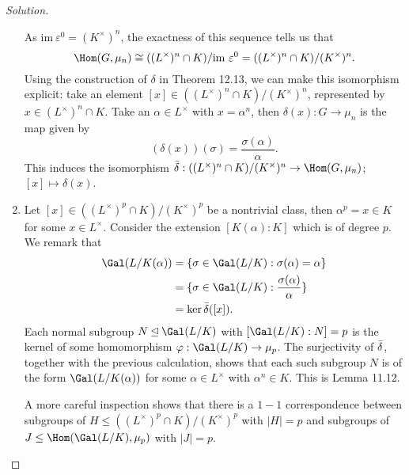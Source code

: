 \documentclass[a4paper,10pt,reqno]{amsart}
\newenvironment{sol}
  {\renewcommand\qedsymbol{$\blacksquare$}\begin{proof}[Solution]}
  {\end{proof}}
\begin{document}
\begin{sol}
\begin{enumerate}[label=(\roman*)]
    As $\mathrm{im}\ \varepsilon^0 = (K^{\times})^n$, the exactness of this sequence tells us that
    \[
    \Hom(G,\mu_n) \cong ((L^{\times})^n \cap K) / \mathrm{im}\ \varepsilon^0 = ((L^{\times})^n \cap K) / (K^{\times})^n.
    \]
    Using the construction of $\delta$ in Theorem 12.13, we can make this isomorphism explicit: take an element $[x] \in ((L^{\times})^n \cap K) / (K^{\times})^n$, represented by $x \in (L^{\times})^n \cap K$. Take an $\alpha \in L^{\times}$ with $x = \alpha^n$, then $\delta(x): G \to \mu_n$ is the map given by
    \[
    (\delta(x))(\sigma) = \frac{\sigma(\alpha)}{\alpha}.
    \]
    This induces the isomorphism $\Bar{\delta}: ((L^{\times})^n \cap K) / (K^{\times})^n \to \Hom(G,\mu_n)$; $[x] \mapsto \delta(x)$.

    \item Let $[x] \in ((L^{\times})^p \cap K) / (K^{\times})^p $ be a nontrivial class, then $\alpha^p = x \in K$ for some $x \in L^{\times}$. Consider the extension $[K(\alpha):K]$ which is of degree $p$. We remark that
    \begin{align*}
    \Gal(L/K(\alpha)) & = \{ \sigma \in \Gal(L/K): \sigma(\alpha) = \alpha \} \\
    & = \{ \sigma \in \Gal(L/K): \frac{\sigma(\alpha)}{\alpha} \} \\
    & = \ker \Bar{\delta}([x]).
    \end{align*}
    Each normal subgroup $N \unlhd \Gal(L/K)$ with $[\Gal(L/K):N] = p$ is the kernel of some homomorphism $\varphi: \Gal(L/K) \to \mu_p$. The surjectivity of $\Bar{\delta}$, together with the previous calculation, shows that each such subgroup $N$ is of the form $\Gal(L/K(\alpha))$ for some $\alpha \in L^{\times}$ with $\alpha^n \in K$. This is Lemma 11.12.

    A more careful inspection shows that there is a $1-1$ correspondence between subgroups of $H \leq ((L^{\times})^p \cap K) / (K^{\times})^p$ with $|H| = p$ and subgroups of $J \leq \Hom(\Gal(L/K),\mu_p)$ with $|J| = p$.\qedhere
    \end{enumerate}
\end{sol}
\end{document}
